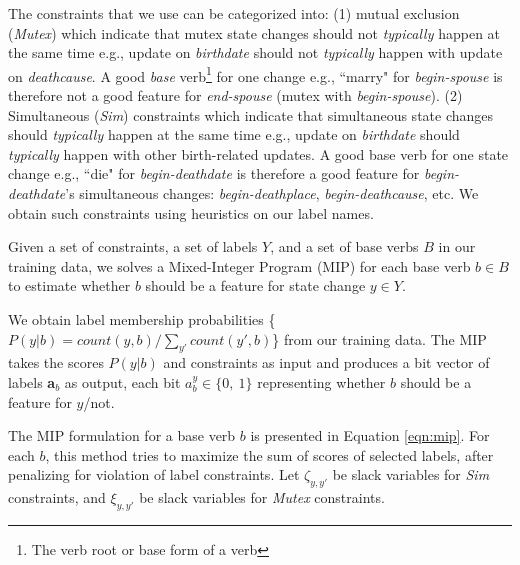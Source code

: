 The constraints that we use can be categorized into: (1) mutual exclusion (\textit{Mutex}) which indicate that mutex state changes should not \textit{typically} happen at the same time e.g., update on \textit{birthdate} should not \textit{typically} happen with update on \textit{deathcause}. %
A good \textit{base} verb\footnote[3]{The verb root or base form of a verb} for one change e.g., ``marry" for \textit{begin-spouse} is therefore not a good feature for \textit{end-spouse} (mutex with \textit{begin-spouse}). (2) Simultaneous (\textit{Sim}) constraints which indicate that simultaneous state changes should \textit{typically} happen at the same time e.g., update on \textit{birthdate} should \textit{typically} happen with other birth-related updates. %
A good base verb for one state change e.g., ``die" for \textit{begin-deathdate} is therefore a good feature for \textit{begin-deathdate}'s simultaneous changes: \textit{begin-deathplace}, \textit{begin-deathcause}, etc. We obtain such constraints using heuristics on our label names.%

Given a set of constraints, a set of labels $Y$, and a set of base verbs $B$ in our training data, we solves a Mixed-Integer Program (MIP) for each base verb $b \in B$ to estimate whether $b$ should be a feature for state change $y \in Y$. 

We obtain label membership probabilities \{$P(y | b) = count(y, b) / \sum_{y'} count(y', b) $\} from our training data. The MIP takes the scores $P(y | b)$ and constraints as input and produces a bit vector of labels \textbf{a}$_{b}$ as output, each bit  $a_{b}^{y} \in \{0,\ 1\}$ representing whether $b$ should be a feature for $y$/not.

The MIP formulation for a base verb $b$ is presented in Equation \ref{eqn:mip}. For each $b$, this method tries to maximize the sum of scores of selected labels, after penalizing for violation of label constraints. Let $\zeta_{y, y'}$ be slack variables for \textit{Sim} constraints, and $\xi_{y, y'}$ be slack variables for \textit{Mutex} constraints. 

